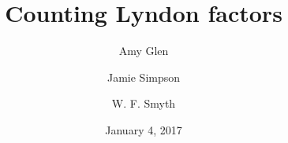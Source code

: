 \documentclass[11pt]{amsart}
\newcommand{\1}{\bar{1}}
\theoremstyle{plain}
\theoremstyle{definition}
\theoremstyle{remark}
\begin{document}
\title{Counting Lyndon factors}


\author{Amy Glen}

\address{Amy Glen \newline
\indent School of Engineering \& Information Technology \newline
\indent Murdoch University \newline
{} South Street \newline
\indent Murdoch, WA 6150 AUSTRALIA}%

\author{Jamie Simpson}

\address{Jamie Simpson \newline
\indent Department of Mathematics and Statistics \newline
\indent Curtin University \newline
\indent Bentley, WA 6102 AUSTRALIA}%

\author{W. F. Smyth}
\address{W. F. Smyth \newline
\indent Department of Computing and Software \newline
\indent McMaster University \newline
\indent Hamilton, Ontario L8S4K1 CANADA}%





\date{January 4, 2017}
\end{document}
